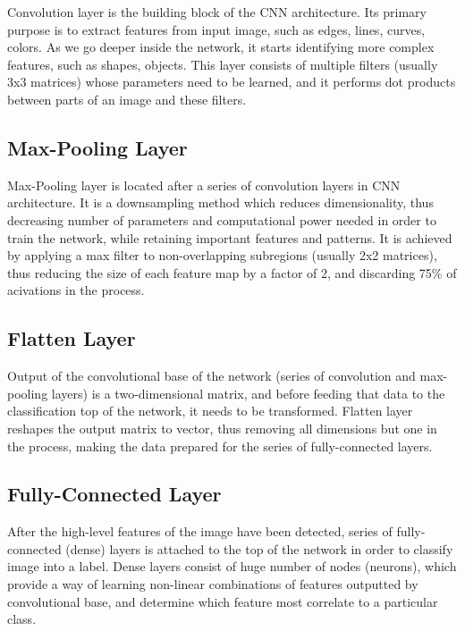 Convolution layer is the building block of the CNN architecture. Its primary purpose is to extract features from input image, such as edges, lines, curves, colors. As we go deeper inside the network, it starts identifying more complex features, such as shapes, objects. This layer consists of multiple filters (usually 3x3 matrices) whose parameters need to be learned, and it performs dot products between parts of an image and these filters.

\subsection{Max-Pooling Layer}

Max-Pooling layer is located after a series of convolution layers in CNN architecture. It is a downsampling method which reduces dimensionality, thus decreasing number of parameters and computational power needed in order to train the network, while retaining important features and patterns. It is achieved by applying a max filter to non-overlapping subregions (usually 2x2 matrices), thus reducing the size of each feature map by a factor of 2, and discarding 75\% of acivations in the process.

\subsection{Flatten Layer}

Output of the convolutional base of the network (series of convolution and max-pooling layers) is a two-dimensional matrix, and before feeding that data to the classification top of the network, it needs to be transformed. Flatten layer reshapes the output matrix to vector, thus removing all dimensions but one in the process, making the data prepared for the series of fully-connected layers.

\subsection{Fully-Connected Layer}

After the high-level features of the image have been detected, series of fully-connected (dense) layers is attached to the top of the network in order to classify image into a label. Dense layers consist of huge number of nodes (neurons), which provide a way of learning non-linear combinations of features outputted by convolutional base, and determine which feature most correlate to a particular class.


